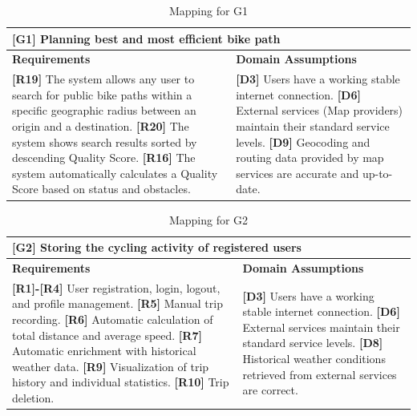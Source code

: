 \begin{table}[H]
    \centering
    \begin{tabular}{|p{7cm}|p{7cm}|}
        \hline
        \multicolumn{2}{|p{14cm}|}{\textbf{[G1]} Planning best and most efficient bike path} \\
        \hline
        \textbf{Requirements} & \textbf{Domain Assumptions} \\
        \hline
        \textbf{[R19]} The system allows any user to search for public bike paths within a specific geographic radius between an origin and a destination. \newline
        \textbf{[R20]} The system shows search results sorted by descending Quality Score. \newline
        \textbf{[R16]} The system automatically calculates a Quality Score based on status and obstacles. & 
        \textbf{[D3]} Users have a working stable internet connection. \newline
        \textbf{[D6]} External services (Map providers) maintain their standard service levels. \newline
        \textbf{[D9]} Geocoding and routing data provided by map services are accurate and up-to-date. \\
        \hline
    \end{tabular}
    \caption{Mapping for G1}
    \label{tab:map_g1}
\end{table}

\begin{table}[H]
    \centering
    \begin{tabular}{|p{7cm}|p{7cm}|}
        \hline
        \multicolumn{2}{|p{14cm}|}{\textbf{[G2]} Storing the cycling activity of registered users} \\
        \hline
        \textbf{Requirements} & \textbf{Domain Assumptions} \\
        \hline
        \textbf{[R1]-[R4]} User registration, login, logout, and profile management. \newline
        \textbf{[R5]} Manual trip recording. \newline
        \textbf{[R6]} Automatic calculation of total distance and average speed. \newline
        \textbf{[R7]} Automatic enrichment with historical weather data. \newline
        \textbf{[R9]} Visualization of trip history and individual statistics. \newline
        \textbf{[R10]} Trip deletion. & 
        \textbf{[D3]} Users have a working stable internet connection. \newline
        \textbf{[D6]} External services maintain their standard service levels. \newline
        \textbf{[D8]} Historical weather conditions retrieved from external services are correct. \\
        \hline
    \end{tabular}
    \caption{Mapping for G2}
    \label{tab:map_g2}
\end{table}

